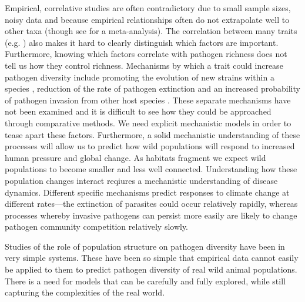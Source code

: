 Empirical, correlative studies are often contradictory due to small sample sizes, noisy data and because empirical relationships often do not extrapolate well to other taxa (though see \cite{kamiya2014determines} for a meta-analysis).
The correlation between many traits (e.g. \textcite{nunn2015infectious}) also makes it hard to clearly distinguish which factors are important.
Furthermore, knowing which factors correlate with pathogen richness does not tell us how they control richness. 
Mechanisms by which a trait could increase pathogen diversity include promoting the evolution of new strains within a species \cite{buckee2004effects}, reduction of the rate of pathogen extinction \cite{rand1995invasion} and an increased probability of pathogen invasion from other host species \cite{nunes2006localized}.
These separate mechanisms have not been examined and it is difficult to see how they could be approached through comparative methods.
We need explicit mechanistic models in order to tease apart these factors.
Furthermore, a solid mechanistic understanding of these processes will allow us to predict how wild populations will respond to increased human pressure and global change.
As habitats fragment we expect wild populations to become smaller and less well connected.
Understanding how these population changes interact reqiures a mechanistic understanding of disease dynamics.
Different specific mechanisms predict responses to climate change at different rates---the extinction of parasites could occur relatively rapidly, whereas processes whereby invasive pathogens can persist more easily are likely to change pathogen community competition relatively slowly.




 

Studies of the role of population structure on pathogen diversity have been in very simple systems.
These have been so simple that empirical data cannot easily be applied to them to predict pathogen diversity of real wild animal populations.
There is a need for models that can be carefully and fully explored, while still capturing the complexities of the real world.

